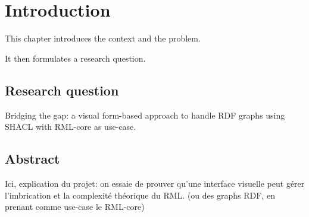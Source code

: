 
\chapter{Introduction}
\label{chap:introduction}

This chapter introduces the context and the problem.

It then formulates a research question.



\section{Research question}
Bridging the gap:  a visual form-based approach to handle RDF graphs using SHACL with RML-core as use-case.

\section{Abstract}
Ici, explication du projet: on essaie de prouver qu'une interface visuelle peut gérer l'imbrication et la complexité théorique du RML. (ou des graphs RDF, en prenant comme use-case le RML-core)


